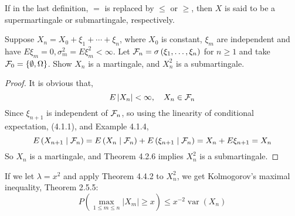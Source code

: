 \begin{remark}
	If in the last definition, \(=\) is replaced by \(\leq\) or \(\geq\), then \(X\) is said to be a supermartingale or submartingale, respectively.
\end{remark}

\begin{example}

\end{example}

\begin{example}

\end{example}

\begin{example}

\end{example}

\begin{example}
	Suppose \(X_{n}=X_{0}+\xi_{1}+\cdots+\xi_{n}\), where \(X_{0}\) is constant, \(\xi_{m}\) are independent and have \(E\xi_{m}=0,\sigma_{m}^{2}=E\xi_{m}^{2}<\infty\). Let \(\mathcal{F}_{n}=\sigma\left(\xi_{1},\ldots,\xi_{n}\right)\) for \(n\geq 1\) and take \(\mathcal{F}_{0}=\{\emptyset, \Omega\}\). Show \(X_{n}\) is a martingale, and \(X_{n}^{2}\) is a submartingale.
\end{example}

\begin{proof}
	It is obvious that,
	\begin{equation*}
		E\left|X_{n}\right|<\infty,\quad X_{n}\in\mathcal{F}_{n}
	\end{equation*}
	Since \(\xi_{n+1}\) is independent of \(\mathcal{F}_{n}\), so using the linearity of conditional expectation, (4.1.1), and Example 4.1.4,
	\begin{equation*}
		E\left(X_{n+1}\mid\mathcal{F}_{n}\right)=E\left(X_{n}\mid\mathcal{F}_{n}\right)+E\left(\xi_{n+1}\mid\mathcal{F}_{n}\right)=X_{n}+E\xi_{n+1}=X_{n}
	\end{equation*}
	So \(X_{n}\) is a martingale, and Theorem 4.2.6 implies \(X_{n}^{2}\) is a submartingale.
\end{proof}

\begin{remark}
	If we let \(\lambda=x^{2}\) and apply Theorem 4.4.2 to \(X_{n}^{2}\), we get Kolmogorov's maximal inequality, Theorem 2.5.5:
	\begin{equation}
		P\left(\max_{1\leq m\leq n}\left|X_{m}\right|\geq x\right)\leq x^{-2}\operatorname{var}\left(X_{n}\right)
	\end{equation}
\end{remark}


